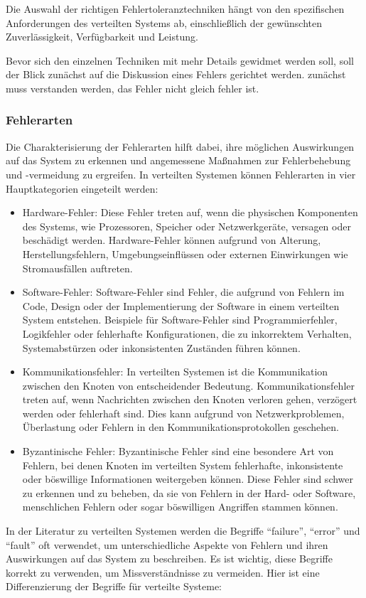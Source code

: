 \documentclass[../vs-script-first-v01.tex]{subfiles}
\begin{document}
Die Auswahl der richtigen Fehlertoleranztechniken hängt von den spezifischen Anforderungen des verteilten Systems ab, einschließlich der gewünschten Zuverlässigkeit, Verfügbarkeit und Leistung.

Bevor sich den einzelnen Techniken mit mehr Details gewidmet werden soll, soll der Blick zunächst auf die Diskussion eines Fehlers gerichtet werden. zunächst muss verstanden werden, das Fehler nicht gleich fehler ist. 
\subsubsection{Fehlerarten}
Die Charakterisierung der Fehlerarten hilft dabei, ihre möglichen Auswirkungen auf das System zu erkennen und angemessene Maßnahmen zur Fehlerbehebung und -vermeidung zu ergreifen.
In verteilten Systemen können Fehlerarten in vier Hauptkategorien eingeteilt werden:
\begin{itemize}
\item Hardware-Fehler: Diese Fehler treten auf, wenn die physischen Komponenten des Systems, wie Prozessoren, Speicher oder Netzwerkgeräte, versagen oder beschädigt werden. Hardware-Fehler können aufgrund von Alterung, Herstellungsfehlern, Umgebungseinflüssen oder externen Einwirkungen wie Stromausfällen auftreten.
\item Software-Fehler: Software-Fehler sind Fehler, die aufgrund von Fehlern im Code, Design oder der Implementierung der Software in einem verteilten System entstehen. Beispiele für Software-Fehler sind Programmierfehler, Logikfehler oder fehlerhafte Konfigurationen, die zu inkorrektem Verhalten, Systemabstürzen oder inkonsistenten Zuständen führen können.
\item Kommunikationsfehler: In verteilten Systemen ist die Kommunikation zwischen den Knoten von entscheidender Bedeutung. Kommunikationsfehler treten auf, wenn Nachrichten zwischen den Knoten verloren gehen, verzögert werden oder fehlerhaft sind. Dies kann aufgrund von Netzwerkproblemen, Überlastung oder Fehlern in den Kommunikationsprotokollen geschehen.
\item Byzantinische Fehler: Byzantinische Fehler sind eine besondere Art von Fehlern, bei denen Knoten im verteilten System fehlerhafte, inkonsistente oder böswillige Informationen weitergeben können. Diese Fehler sind schwer zu erkennen und zu beheben, da sie von Fehlern in der Hard- oder Software, menschlichen Fehlern oder sogar böswilligen Angriffen stammen können.
\end{itemize}
In der Literatur zu verteilten Systemen werden die Begriffe \enquote{failure}, \enquote{error} und \enquote{fault} oft verwendet, um unterschiedliche Aspekte von Fehlern und ihren Auswirkungen auf das System zu beschreiben. Es ist wichtig, diese Begriffe korrekt zu verwenden, um Missverständnisse zu vermeiden. Hier ist eine Differenzierung der Begriffe für verteilte Systeme:
\end{document}
